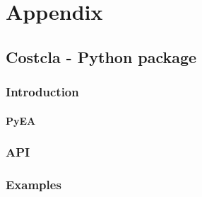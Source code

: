 \documentclass[twoside,openright,titlepage,numbers=noenddot,headinclude,%
               footinclude=true,cleardoublepage=empty,abstractoff,BCOR=5mm,%
               paper=a4,fontsize=11pt,ngerman,american,doublespace]{scrreprt}
\numberwithin{theorem}{chapter}
\numberwithin{definition}{chapter}
\numberwithin{algorithm}{chapter}
\numberwithin{figure}{chapter}
\numberwithin{table}{chapter}
\numberwithin{equation}{chapter}
\begin{document}
\appendix
\cleardoublepage
\part{Appendix}
	\chapter{Costcla - Python package}
		\section{Introduction}
			\subsection{PyEA}
		\section{API}
		\section{Examples}

	\cleardoublepage

\cleardoublepage
\end{document}
